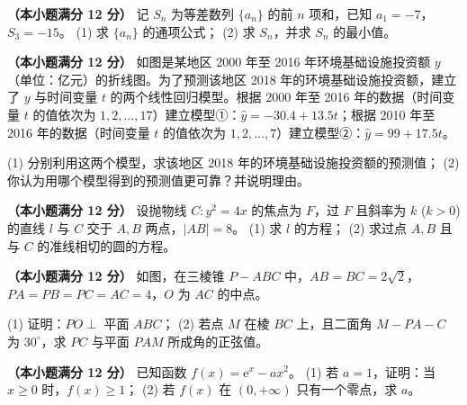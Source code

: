 \begin{question}
\textbf{（本小题满分 12 分）} 
记 $S_n$ 为等差数列 $\{a_n\}$ 的前 $n$ 项和，已知 $a_1=-7$，$S_3=-15$。
(1) 求 $\{a_n\}$ 的通项公式；
(2) 求 $S_n$，并求 $S_n$ 的最小值。

\Needspace{0.4\textheight}
\end{question}
\begin{question}
\textbf{（本小题满分 12 分）} 
如图是某地区 2000 年至 2016 年环境基础设施投资额 $y$（单位：亿元）的折线图。为了预测该地区 2018 年的环境基础设施投资额，建立了 $y$ 与时间变量 $t$ 的两个线性回归模型。根据 2000 年至 2016 年的数据（时间变量 $t$ 的值依次为 $1, 2, \dots, 17$）建立模型①：$\hat y = -30.4 + 13.5t$；根据 2010 年至 2016 年的数据（时间变量 $t$ 的值依次为 $1, 2, \dots, 7$）建立模型②：$\hat y = 99 + 17.5t$。
\nopagebreak[4]
\begin{center}\end{center}
\nopagebreak[4]
(1) 分别利用这两个模型，求该地区 2018 年的环境基础设施投资额的预测值；
(2) 你认为用哪个模型得到的预测值更可靠？并说明理由。

\end{question}
\begin{question}
\textbf{（本小题满分 12 分）} 
设抛物线 $C: y^2=4x$ 的焦点为 $F$，过 $F$ 且斜率为 $k$ ($k>0$) 的直线 $l$ 与 $C$ 交于 $A, B$ 两点，$|AB|=8$。
(1) 求 $l$ 的方程；
(2) 求过点 $A, B$ 且与 $C$ 的准线相切的圆的方程。

\Needspace{0.4\textheight}
\end{question}
\begin{question}
\textbf{（本小题满分 12 分）} 
如图，在三棱锥 $P-ABC$ 中，$AB=BC=2\sqrt2$，$PA=PB=PC=AC=4$，$O$ 为 $AC$ 的中点。
\nopagebreak[4]
\begin{center}\end{center}
\nopagebreak[4]
(1) 证明：$PO\perp$ 平面 $ABC$；
(2) 若点 $M$ 在棱 $BC$ 上，且二面角 $M-PA-C$ 为 $30^\circ$，求 $PC$ 与平面 $PAM$ 所成角的正弦值。

\end{question}
\begin{question}
\textbf{（本小题满分 12 分）} 
已知函数 $f(x)=\mathrm e^x-ax^2$。
(1) 若 $a=1$，证明：当 $x\geqslant 0$ 时，$f(x)\geqslant 1$；
(2) 若 $f(x)$ 在 $(0,+\infty)$ 只有一个零点，求 $a$。

\par\medskip

\end{question}

